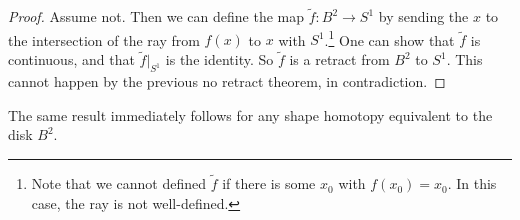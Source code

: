 \begin{proof}
  Assume not. Then we can define the
  map $\widetilde{f} : B^2 \to S^1$ by sending
  the $x$ to the intersection of the ray from
  $f(x)$ to $x$ with $S^1$.\footnote{Note that we cannot defined $\widetilde{f}$ if there is some $x_0$ with $f(x_0) = x_0$. In this case, the ray is not well-defined.} One can show that
  $\widetilde{f}$ is continuous, and that
  $\widetilde{f}|_{S^1}$ is the identity. So
  $\widetilde{f}$ is a retract from $B^2$ to $S^1$.
  This cannot happen by the previous no retract
  theorem, in contradiction.
\end{proof}

\begin{remark}
  The same result immediately follows for any
  shape homotopy equivalent to the disk $B^2$.
\end{remark}
